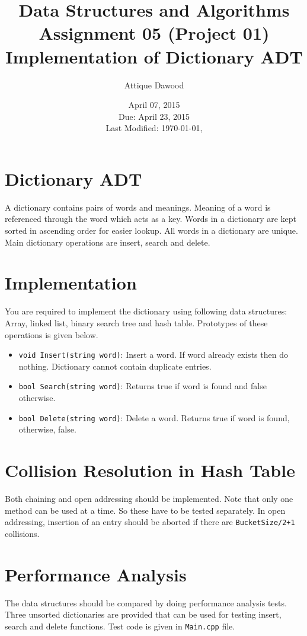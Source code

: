\documentclass[12pt,a4paper]{article}
\title{Data Structures and Algorithms\\Assignment 05 (Project 01)\\Implementation of Dictionary ADT}
\author{Attique Dawood}
\date{April 07, 2015\\Due: April 23, 2015\\[0.2cm] Last Modified: \today, \currenttime}
\begin{document}
\maketitle
\section{Dictionary ADT}
A dictionary contains pairs of words and meanings. Meaning of a word is referenced through the word which acts as a key. Words in a dictionary are kept sorted in ascending order for easier lookup. All words in a dictionary are unique. Main dictionary operations are insert, search and delete. 
\section{Implementation}
You are required to implement the dictionary using following data structures: Array, linked list, binary search tree and hash table. Prototypes of these operations is given below.
\begin{itemize}
\item \verb|void Insert(string word)|: Insert a word. If word already exists then do nothing. Dictionary cannot contain duplicate entries.
\item \verb|bool Search(string word)|: Returns true if word is found and false otherwise.
\item \verb|bool Delete(string word)|: Delete a word. Returns true if word is found, otherwise, false.
\end{itemize}
\section{Collision Resolution in Hash Table}
Both chaining and open addressing should be implemented. Note that only one method can be used at a time. So these have to be tested separately. In open addressing, insertion of an entry should be aborted if there are \verb|BucketSize/2+1| collisions.
\section{Performance Analysis}
The data structures should be compared by doing performance analysis tests. Three unsorted dictionaries are provided that can be used for testing insert, search and delete functions. Test code is given in \verb|Main.cpp| file.
\end{document}
